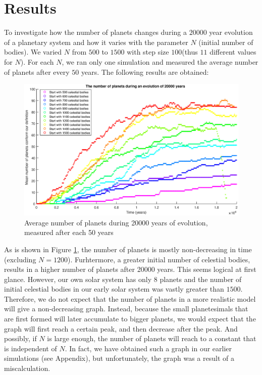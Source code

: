 \section{Results}\label{sec:results}
To investigate how the number of planets changes during a $20000$ year evolution of a planetary system and how it varies with the parameter $N$ (initial number of bodies). 
We varied $N$ from $500$ to $1500$ with step size $100$(thus $11$ different values for $N$). 
For each $N$, we ran only one simulation and measured the average number of planets after every $50$ years. The following results are obtained:

\begin{figure}[H]
\centering
\includegraphics[width=\textwidth]{AantPlanetenNieuw.eps}
\caption{Average number of planets during 20000 years of evolution, measured after each 50 years}
    \label{fig:AantPlanetenNieuw}
\end{figure}
As is shown in Figure \ref{fig:AantPlanetenNieuw}, the number of planets is mostly non-decreasing in time (excluding \(N=1200\)). 
Furhtermore, a greater initial number of celestial bodies, results in a higher number of planets after 20000 years. This seems logical at first glance. However, our own solar system has only 8 planets and the number of initial celestial bodies in our early solar system was vastly greater than  $1500$. Therefore, we do not expect that the number of planets in a more realistic model will give a non-decreasing graph.
Instead, because the small planetesimals that are first formed will later accumulate to bigger planets, we would expect that the graph will first reach a certain peak, and then decrease after the peak.
And possibly, if $N$ is large enough, the number of planets will reach to a constant that is independent of $N$. In fact, we have obtained such a graph in our earlier simulations (see Appendix), but unfortunately, the graph was a result of a miscalculation.\\

